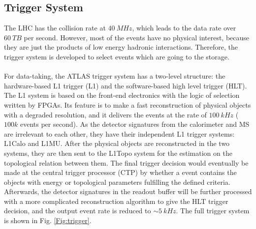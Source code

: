 \subsection{Trigger System}
The LHC has the collision rate at $40~MHz$, which leads to the data rate over $60~TB$ per second. However, most of the events have no physical interest, because they are just the products of low energy hadronic interactions. Therefore, the trigger system is developed to select events which are going to the storage.
\\
\\For data-taking, the ATLAS trigger system has a two-level structure: the hardware-based L1 trigger (L1) and the software-based high level trigger (HLT). The L1 system is based on the front-end electronics with the logic of selection written by FPGAs. Its feature is to make a fast reconstruction of physical objects with a degraded resolution, and it delivers the events at the rate of $100~kHz$ ($100k$ events per second). As the detector signatures from the calorimeter and MS are irrelevant to each other, they have their independent L1 trigger systems: L1Calo and L1MU. After the physical objects are reconstructed in the two systems, they are then sent to the L1Topo system for the estimation on the topological relation between them. The final trigger decision would eventually be made at the central trigger processor (CTP) by whether a event contains the objects with energy or topological parameters fulfilling the defined criteria. Afterwards, the detector signatures in the readout buffer will be further processed with a more complicated reconstruction algorithm to give the HLT trigger decision, and the output event rate is reduced to $\sim 5~kHz$. The full trigger system is shown in Fig. \ref{Fig:trigger}.

